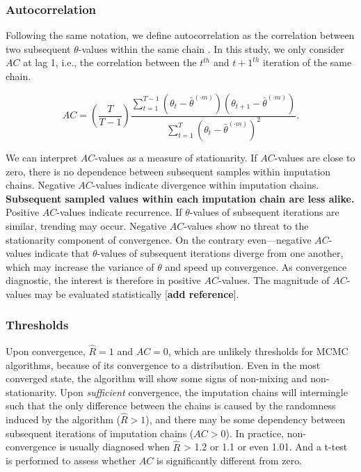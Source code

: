 \documentclass[Royal,times,sageh]{sagej}
\begin{document}
\hypertarget{autocorrelation}{%
\subsubsection{Autocorrelation}\label{autocorrelation}}

Following the same notation, we define autocorrelation as the
correlation between two subsequent \(\theta\)-values within the same
chain \citep[p.~147]{lync07}. In this study, we only consider \(AC\) at
lag 1, i.e., the correlation between the \(t^{th}\) and \(t+1^{th}\)
iteration of the same chain.

\begin{equation*}
AC = \left( \frac{T}{T-1} \right) \frac{\sum_{t=1}^{T-1}(\theta_t - \bar{\theta}^{(\cdot m)})(\theta_{t+1} - \bar{\theta}^{(\cdot m)})}{\sum_{t=1}^{T}(\theta_t - \bar{\theta}^{(\cdot m)})^2}.
\end{equation*}

We can interpret \(AC\)-values as a measure of stationarity. If
\(AC\)-values are close to zero, there is no dependence between
subsequent samples within imputation chains. Negative \(AC\)-values
indicate divergence within imputation chains. \textbf{Subsequent sampled
values within each imputation chain are less alike.} Positive
\(AC\)-values indicate recurrence. If \(\theta\)-values of subsequent
iterations are similar, trending may occur. Negative \(AC\)-values show
no threat to the stationarity component of convergence. On the contrary
even---negative \(AC\)-values indicate that \(\theta\)-values of
subsequent iterations diverge from one another, which may increase the
variance of \(\theta\) and speed up convergence. As convergence
diagnostic, the interest is therefore in positive \(AC\)-values. The
magnitude of \(AC\)-values may be evaluated statistically {[}\textbf{add
reference}{]}.

\hypertarget{thresholds}{%
\subsubsection{Thresholds}\label{thresholds}}

Upon convergence, \(\widehat{R}=1\) and \(AC=0\), which are unlikely
thresholds for MCMC algorithms, because of its convergence to a
distribution. Even in the most converged state, the algorithm will show
some signs of non-mixing and non-stationarity. Upon \emph{sufficient}
convergence, the imputation chains will intermingle such that the only
difference between the chains is caused by the randomness induced by the
algorithm (\(\widehat{R} > 1\)), and there may be some dependency
between subsequent iterations of imputation chains (\(AC > 0\)). In
practice, non-convergence is usually diagnosed when \(\widehat{R}\)
\textgreater{} 1.2 or 1.1 or even 1.01. And a t-test is performed to
assess whether \(AC\) is significantly different from zero.
\end{document}
